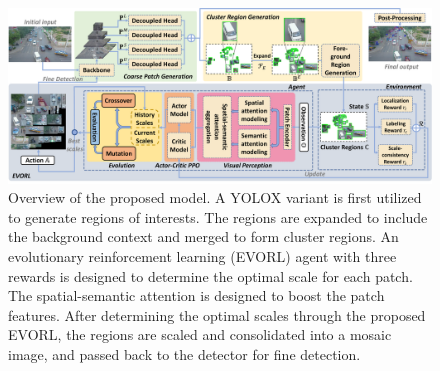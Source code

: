 \documentclass[letterpaper]{article} %
\newcommand\blue[1]{\textcolor{blue}{#1}}
\newcommand\rjf[1]{\textcolor{red}{\{RJF: #1\}}}
\begin{document}
\begin{figure}[!tb]
	\centering
	\includegraphics[width= \linewidth]{images/structure2.pdf}
	\caption{Overview of the proposed model.
 A YOLOX variant is first utilized to generate regions of interests. The regions are expanded to include the background context and merged to form cluster regions. An evolutionary reinforcement learning (EVORL) agent with three rewards %
 is designed to determine the optimal scale for each patch. The spatial-semantic attention is designed to boost the patch features. After determining the optimal scales through the proposed EVORL, the regions are scaled and consolidated into a mosaic image, and passed back to the detector for fine detection. %
}
\end{figure}
\end{document}
